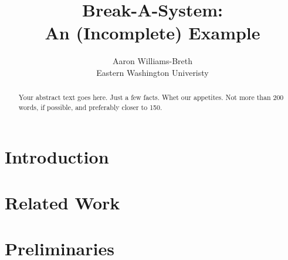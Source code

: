 \documentclass[letterpaper,twocolumn,10pt]{article}
\begin{document}

\date{}

\title{\Large \bf Break-A-System:\\
  An (Incomplete) Example}

\author{
{\rm Aaron Williams-Breth}\\
Eastern Washington Univeristy
} %

\maketitle

\begin{abstract}
Your abstract text goes here. Just a few facts. Whet our appetites.
Not more than 200 words, if possible, and preferably closer to 150.
\end{abstract}


\section{Introduction}
\label{sec:intro}

 
\section{Related Work}
\label{sec:related}

 
\section{Preliminaries}
\label{sec:prelim}

 
\end{document}
